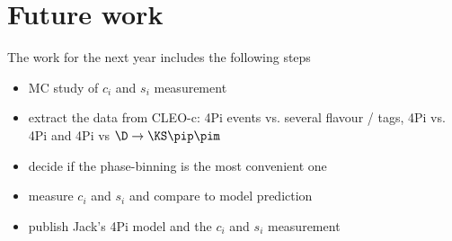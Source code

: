 \section{Future work}
The work for the next year includes the following steps
\begin{itemize}
\item MC study of $c_i$ and $s_i$ measurement
\item extract the data from CLEO-c: \DTo4Pi events vs. several flavour / \CP tags, \DTo4Pi vs. \DTo4Pi and \DTo4Pi vs $\D \rightarrow \KS \pip \pim$
\item decide if the phase-binning is the most convenient one
\item measure $c_i$ and $s_i$ and compare to model prediction
\item publish Jack's \DzTo4Pi model and the $c_i$ and $s_i$ measurement
\end{itemize}